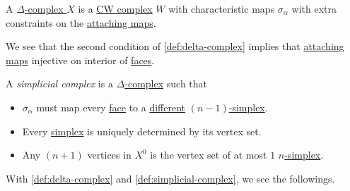 \begin{exercise}
	A \hyperref[def:delta-complex]{\(\Delta\)-complex } \(X\) is a \hyperref[def:CW-Complex]{CW complex} \(W\) with characteristic maps \(\sigma _\alpha \) with extra constraints on the \hyperref[def:attaching-map]{attaching maps}.
\end{exercise}

\begin{note}
	We see that the second condition of \autoref{def:delta-complex} implies that \hyperref[def:attaching-map]{attaching maps} injective on interior of \hyperref[def:face]{faces}.
\end{note}

\begin{definition}\label{def:simplicial-complex}
	A \emph{simplicial complex} is a \hyperref[def:delta-complex]{\(\Delta \)-complex} such that
	\begin{itemize}
		\item \(\sigma _\alpha \) must map every \hyperref[def:face]{face} to a \underline{different} \hyperref[def:standard-simplex]{\((n-1)\)-simplex}.
		\item Every \hyperref[def:standard-simplex]{simplex} is uniquely determined by its vertex set.
		\item Any \((n+1)\) vertices in \(X^0\) is the vertex set of at most \(1\) \hyperref[def:standard-simplex]{\(n\)-simplex}.
	\end{itemize}
\end{definition}

\begin{eg}
	With \autoref{def:delta-complex} and \autoref{def:simplicial-complex}, we see the followings.
	\begin{figure}[H]
		\centering
		\label{fig:rmk:simplicial-complex}
	\end{figure}
\end{eg}

